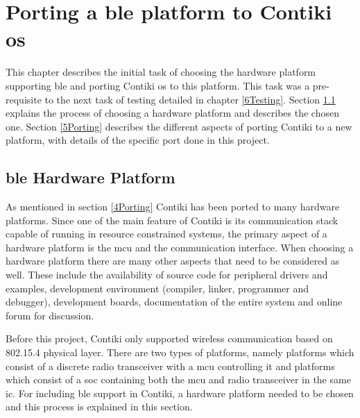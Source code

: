 \chapter{Porting a \gls{ble} platform to Contiki \gls{os}} \label{5bleContiki}

This chapter describes the initial task of choosing the hardware platform supporting \gls{ble} and porting Contiki \gls{os} to this platform. This task was a pre-requisite to the next task of testing detailed in chapter \ref{6Testing}. Section \ref{5HwPlt} explains the process of choosing a hardware platform and describes the chosen one. Section \ref{5Porting} describes the different aspects of porting Contiki to a new platform, with details of the specific port done in this project.

\section{\gls{ble} Hardware Platform} \label{5HwPlt}

As mentioned in section \ref{4Porting} Contiki has been ported to many hardware platforms. Since one of the main feature of Contiki is its communication stack capable of running in resource constrained systems, the primary aspect of a hardware platform is the \gls{mcu} and the communication interface. When choosing a hardware platform there are many other aspects that need to be considered as well. These include the availability of source code for peripheral drivers and examples, development environment (compiler, linker, programmer and debugger), development boards, documentation of the entire system and online forum for discussion.

Before this project, Contiki only supported wireless communication based on 802.15.4 physical layer. There are two types of platforms, namely platforms which consist of a discrete radio transceiver with a \gls{mcu} controlling it and platforms which consist of a \gls{soc} containing both the \gls{mcu} and radio transceiver in the same \gls{ic}. For including \gls{ble} support in Contiki, a hardware platform needed to be chosen and this process is explained in this section.

